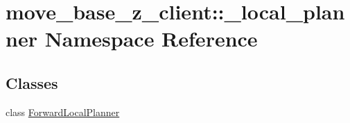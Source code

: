 \hypertarget{namespacemove__base__z__client_1_1__local__planner}{}\section{move\+\_\+base\+\_\+z\+\_\+client\+:\+:\+\_\+local\+\_\+planner Namespace Reference}
\label{namespacemove__base__z__client_1_1__local__planner}
\subsection*{Classes}
\begin{DoxyCompactItemize}
\item 
class \hyperlink{classmove__base__z__client_1_1__local__planner_1_1ForwardLocalPlanner}{Forward\+Local\+Planner}
\end{DoxyCompactItemize}

